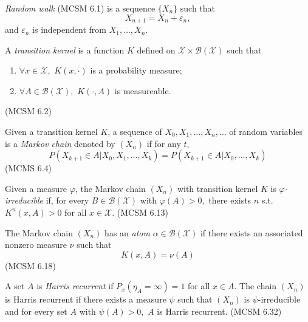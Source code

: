 \begin{definition}
    \emph{Random walk} (MCSM 6.1) is a sequence $\{X_n\}$ such that
    $$X_{n+1} = X_n + \varepsilon_n,$$ and $\varepsilon_n$ is independent from $X_1, \dots, X_n$.
\end{definition}

\begin{definition}
    A \emph{transition kernel} is a function $K$ defined on $\mathcal{X}\times\mathcal{B}(\mathcal{X})$ such that\begin{enumerate}
        \item $\forall x\in\mathcal{X},\,\,K(x,\cdot)$ is a probability measure;
        \item $\forall A\in\mathcal{B}(\mathcal{X}),\,\, K(\cdot, A)$ is measureable.
    \end{enumerate} (MCSM 6.2)
\end{definition}

\begin{definition}
    Given a transition kernel $K$, a sequence of $X_0, X_1, \dots, X_n, \dots$ of random variables is a \emph{Markov chain} denoted by $(X_n)$ if for any $t$, $$P(X_{k+1}\in A|X_0, X_1, \dots, X_k) = P(X_{k+1}\in A|X_0, \dots, X_k)$$ (MCMS 6.4)
\end{definition}

\begin{definition}
    Given a measure $\varphi$, the Markov chain $(X_n)$ with transition kernel $K$ is \emph{$\varphi$-irreducible} if, for every $B\in\mathcal{B}(\mathcal{X})$ with $\varphi(A)>0,$ there exists $n$ s.t. $K^n(x, A)>0$ for all $x\in\mathcal{X}$. (MCSM 6.13)
\end{definition}

\begin{definition}[Atom]
    The Markov chain $(X_n)$ has an \emph{atom} ${\alpha\in\mathcal{B}(\mathcal{X})}$ if there exists an associated nonzero measure $\nu$ such that $$K(x, A) = \nu(A)$$ (MCSM 6.18)
\end{definition}

\begin{definition}
    A set $A$ is \emph{Harris recurrent} if $P_x(\eta_A = \infty) = 1$ for all $x\in A.$ The chain $(X_n)$ is Harris recurrent if there exists a measure $\psi$ such that $(X_n)$ is $\psi$-irreducible and for every set $A$ with $\psi(A) > 0,$ $A$ is Harris recurrent. (MCSM 6.32)
\end{definition}

